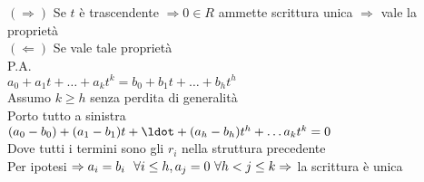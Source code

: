 \documentclass{article}
\begin{document}
	 \begin{dimo}
	 	$ (\Rightarrow )$ Se $t$ è trascendente $ \Rightarrow 0
		\in R$ ammette scrittura unica $ \Rightarrow $ vale la proprietà\\
		$ ( \Leftarrow)$ Se vale tale proprietà \\
		P.A.\\
		 $a_0 + a_1t + \ldots + a_kt^k = b_0 + b_1t + \ldots + b_ht^h$\\
		 Assumo $k\geq h$ senza perdita di generalità\\
		 Porto tutto a sinistra\\
		  $(a_0 - b_0) + (a_1 - b_1)t + \ldot + (a_h - b_h)t^h + \ldots a_kt^k = 0$\\
		  Dove tutti i termini sono gli  $r_i$ nella struttura precedente\\
		  Per ipotesi $ \Rightarrow a_i =b_i \ \ \forall i\leq h, a_j = 0\ \forall h < j \leq k\\
		   \Rightarrow $ la scrittura è unica 
	 \end{dimo}


\maketitle
	\newpage
\end{document}
